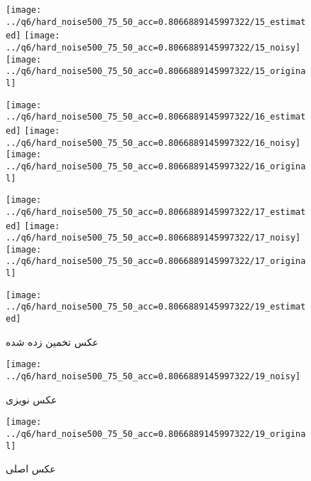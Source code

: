 \documentclass[a4paper,12pt]{article}
\begin{document}
\begin{figure}[!htb]
  \texttt{[image: ../q6/hard\_noise500\_75\_50\_acc=0.8066889145997322/15\_estimated]}
\endminipage\hfill
{}
  \texttt{[image: ../q6/hard\_noise500\_75\_50\_acc=0.8066889145997322/15\_noisy]}
\endminipage\hfill
{}
  \texttt{[image: ../q6/hard\_noise500\_75\_50\_acc=0.8066889145997322/15\_original]}
\endminipage\hfill

  \texttt{[image: ../q6/hard\_noise500\_75\_50\_acc=0.8066889145997322/16\_estimated]}
\endminipage\hfill
{}
  \texttt{[image: ../q6/hard\_noise500\_75\_50\_acc=0.8066889145997322/16\_noisy]}
\endminipage\hfill
{}
  \texttt{[image: ../q6/hard\_noise500\_75\_50\_acc=0.8066889145997322/16\_original]}
\endminipage\hfill

  \texttt{[image: ../q6/hard\_noise500\_75\_50\_acc=0.8066889145997322/17\_estimated]}
\endminipage\hfill
{}
  \texttt{[image: ../q6/hard\_noise500\_75\_50\_acc=0.8066889145997322/17\_noisy]}
\endminipage\hfill
{}
  \texttt{[image: ../q6/hard\_noise500\_75\_50\_acc=0.8066889145997322/17\_original]}
\endminipage\hfill

  \texttt{[image: ../q6/hard\_noise500\_75\_50\_acc=0.8066889145997322/19\_estimated]}
  \caption{  عکس تخمین زده شده }
\endminipage\hfill
{}
  \texttt{[image: ../q6/hard\_noise500\_75\_50\_acc=0.8066889145997322/19\_noisy]}
  \caption{  عکس نویزی }
\endminipage\hfill
{}
  \texttt{[image: ../q6/hard\_noise500\_75\_50\_acc=0.8066889145997322/19\_original]}
  \caption{  عکس اصلی }
\endminipage\hfill
\end{figure}
\end{document}
